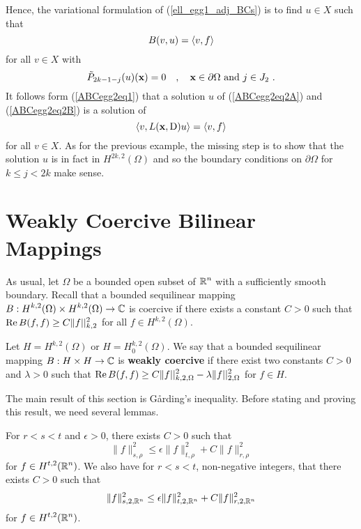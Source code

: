 \begin{egg}
Hence, the variational formulation of (\ref{ell_egg1_adj_BCs}) is to
find $u\in X$ such that
\begin{equation} \label{ABCegg2eq2A}
  B(v,u) = \left\langle{v} , {f}\right\rangle
\end{equation}
for all $\displaystyle v\in X$ with
\begin{equation} \label{ABCegg2eq2B}
\tilde{P}_{2k-1-j}(u)(\mathbf{x}) = 0  \quad , \quad \mathbf{x} \in \partial \Omega
\ \text{and} \ j \in J_2 \ .
\end{equation}
It follows form (\ref{ABCegg2eq1}) that a solution $u$ of
(\ref{ABCegg2eq2A}) and (\ref{ABCegg2eq2B}) is a solution of
\[
\left\langle{v} , {L(\mathbf{x},\operatorname{D})u}\right\rangle = \left\langle{v} , {f}\right\rangle
\]
for all $\displaystyle v\in X$.
As for the previous example, the missing step is to show that the
solution $u$ is in fact in $\displaystyle H^{2k,2}(\Omega)$ and so the
boundary conditions on $\partial \Omega$ for $k \leq j < 2k$ make sense.
\end{egg}

\section{Weakly Coercive Bilinear Mappings}

As usual, let $\Omega$ be a bounded open subset of $\displaystyle \mathbb{R}^n$ with a
sufficiently smooth boundary.  Recall that a bounded sequilinear mapping
$\displaystyle B:H^{k,2}(\Omega)\times H^{k,2}(\Omega) \rightarrow \mathbb{C}$
is coercive if there exists a constant $C>0$ such that 
$\displaystyle \operatorname{Re} B(f,f) \geq C \|f||_{k,2}^2$ for all
$\displaystyle f \in H^{k,2}(\Omega)$.

\begin{defn} \label{ell_weakcoerc}
Let $\displaystyle H = H^{k,2}(\Omega)$ or $H=H^{k,2}_0(\Omega)$.
We say that a bounded sequilinear mapping
$B:H \times H \rightarrow \mathbb{C}$ is {\bfseries weakly coercive}
 if 
there exist two constants $C>0$ and $\lambda >0$ such that 
$\displaystyle \operatorname{Re} B(f,f) \geq C \|f||_{k,2,\Omega}^2 - \lambda
\|f||_{2,\Omega}^2$ for $f \in H$.
\end{defn}

The main result of this section is G\r{a}rding's inequality.  Before
stating and proving this result, we need several lemmas.

\begin{lemma} \label{ell_garding4}
For $r<s<t$ and $\epsilon>0$, there exists $C>0$ such that
\[
\|f\|_{s,\rho}^2 \leq \epsilon \| f\|_{t,\rho}^2 + C \| f \|_{r,\rho}^2
\]
for $\displaystyle f \in H^{t,2}(\mathbb{R}^n)$.
We also have for $r<s<t$, non-negative integers, that there exists
$C>0$ such that
\[
\|f\|_{s,2,\mathbb{R}^n}^2 \leq \epsilon \| f\|_{t,2,\mathbb{R}^n}^2 + C \| f \|_{r,2,\mathbb{R}^n}^2
\]
for $\displaystyle f \in H^{t,2}(\mathbb{R}^n)$.
\end{lemma}

